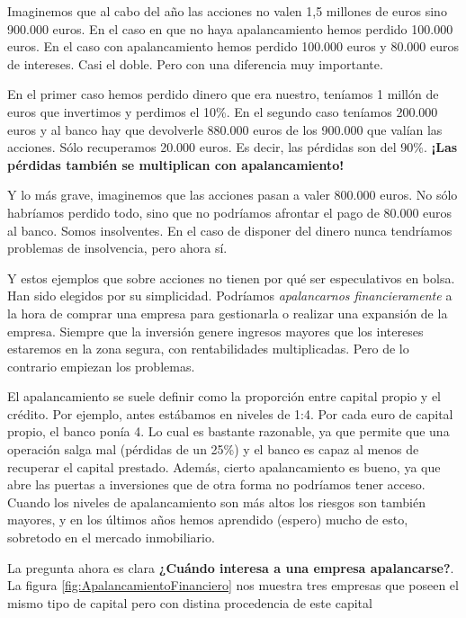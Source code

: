 \documentclass[nochap,palatino,shortheader]{apuntes}
\newcommand{\study}[1]{#1} \newcommand{\substudy}[1]{#1}
\begin{document}
\begin{example}
Imaginemos que al cabo del año las acciones no valen 1,5 millones de euros sino 900.000 euros. En el caso en que no haya apalancamiento hemos perdido 100.000 euros. En el caso con apalancamiento hemos perdido 100.000 euros y 80.000 euros de intereses. Casi el doble. Pero con una diferencia muy importante.

En el primer caso hemos perdido dinero que era nuestro, teníamos 1 millón de euros que invertimos y perdimos el 10\%. En el segundo caso teníamos 200.000 euros y al banco hay que devolverle 880.000 euros de los 900.000 que valían las acciones. Sólo recuperamos 20.000 euros. Es decir, las pérdidas son del 90\%. \textbf{¡Las pérdidas también se multiplican con apalancamiento!}

Y lo más grave, imaginemos que las acciones pasan a valer 800.000 euros. No sólo habríamos perdido todo, sino que no podríamos afrontar el pago de 80.000 euros al banco. Somos insolventes. En el caso de disponer del dinero nunca tendríamos problemas de insolvencia, pero ahora sí.

\end{example}

Y estos ejemplos que sobre acciones no tienen por qué ser especulativos en bolsa. Han sido elegidos por su simplicidad.
Podríamos \textit{apalancarnos financieramente} a la hora de comprar una empresa para gestionarla o realizar una expansión de la empresa.
Siempre que la inversión genere ingresos mayores que los intereses estaremos en la zona segura, con rentabilidades multiplicadas. Pero de lo contrario empiezan los problemas.

El apalancamiento se suele definir como \study{la proporción entre capital propio y el crédito}. Por ejemplo, \substudy{antes estábamos en niveles de 1:4}. Por cada euro de capital propio, el banco ponía 4.
Lo cual es bastante razonable, ya que permite que una operación salga mal (pérdidas de un 25\%) y el banco es capaz al menos de recuperar el capital prestado.
Además, cierto apalancamiento es bueno, ya que abre las puertas a inversiones que de otra forma no podríamos tener acceso.
Cuando los niveles de apalancamiento son más altos los riesgos son también mayores, y en los últimos años hemos aprendido (espero) mucho de esto, sobretodo en el mercado inmobiliario.

La pregunta ahora es clara \textbf{¿Cuándo interesa a una empresa apalancarse?}. La figura \ref{fig:ApalancamientoFinanciero} nos muestra tres empresas que poseen el mismo tipo de capital pero con distina procedencia de este capital
\end{document}

